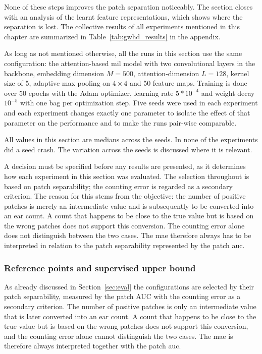 \documentclass[12pt,parskip = half, DIV=classic,listof=totoc]{scrartcl}
\begin{document}
			None of these steps improves the patch separation noticeably. The section closes with
			an analysis of the learnt feature representations, which shows where the separation
			is lost. The collective results of all experiments
			mentioned in this chapter are summarized in Table~\ref{tab:gwhd_results} in the appendix.

			As long as not mentioned otherwise, all the runs in this section use the same configuration: the attention-based \ac{mil} model 
			with two convolutional layers in the backbone, embedding dimension $M=500$, attention-dimension $L=128$, kernel size of 5, 
			adaptive max pooling on $4\times4$ and 50 feature maps. Training is done over 50 epochs with the Adam optimizer, learning rate 
			$5*10^{-4}$ and weight decay $10^{-5}$ with one bag per optimization step. Five seeds were used in each experiment and each experiment
			changes exactly one parameter to isolate the effect of that parameter on the performance and to make the runs pair-wise comparable. 

			All values in this section are medians across the seeds. In none of the
			experiments did a seed crash. The variation across the seeds is discussed where
			it is relevant.

			A decision must be specified before any results are presented, as it determines how each experiment in this section was evaluated. 
			The selection throughout is based on patch separability; the counting error is regarded as a secondary criterion.
			The reason for this stems from the objective: the number of positive patches is merely an intermediate value and is subsequently 
			to be converted into an ear count. A count that happens to be close to the true value but is based on the wrong patches
			does not support this conversion. The counting error alone does not distinguish between the two cases. The 
			\ac{mae} therefore always has to be interpreted in relation to the patch separability represented by the patch \ac{auc}.

			\subsubsection{Reference points and supervised upper bound}	\label{sec:gwhd_reference}

			As already discussed in Section~\ref{sec:eval} the configurations are selected by their patch
			separability, measured by the patch AUC with the counting error as a secondary criterion.
			The number of positive patches is only an intermediate value that is later converted
			into an ear count. A count that happens to be close to the true value but is based on
			the wrong patches does not support this conversion, and the counting error alone
			cannot distinguish the two cases. The \ac{mae} is therefore always interpreted together
			with the patch \ac{auc}.
\end{document}
